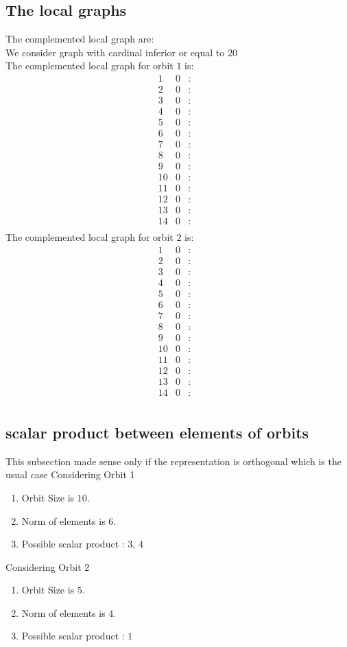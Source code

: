 \documentclass[12pt]{article}
\begin{document}
\subsection{The local graphs}
The complemented local graph are:\\
We consider graph with cardinal inferior or equal to $20$\\
The complemented local graph for orbit $1$ is:
\begin{equation*}
\begin{array}{rrcl}
1&0&:&\\
2&0&:&\\
3&0&:&\\
4&0&:&\\
5&0&:&\\
6&0&:&\\
7&0&:&\\
8&0&:&\\
9&0&:&\\
10&0&:&\\
11&0&:&\\
12&0&:&\\
13&0&:&\\
14&0&:&\\
\end{array}
\end{equation*}
The complemented local graph for orbit $2$ is:
\begin{equation*}
\begin{array}{rrcl}
1&0&:&\\
2&0&:&\\
3&0&:&\\
4&0&:&\\
5&0&:&\\
6&0&:&\\
7&0&:&\\
8&0&:&\\
9&0&:&\\
10&0&:&\\
11&0&:&\\
12&0&:&\\
13&0&:&\\
14&0&:&\\
\end{array}
\end{equation*}
\subsection{scalar product between elements of orbits}
\noindent This subsection made sense only if the representation is orthogonal which is the usual case
Considering Orbit 1
\begin{enumerate}
\item Orbit Size is $10$.
\item Norm of elements is $6$.
\item Possible scalar product : $3$, $4$
\end{enumerate}
Considering Orbit 2
\begin{enumerate}
\item Orbit Size is $5$.
\item Norm of elements is $4$.
\item Possible scalar product : $1$
\end{enumerate}
\end{document}
